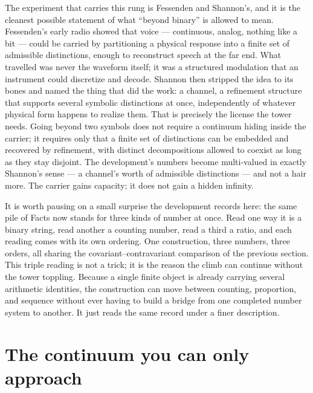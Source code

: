 The experiment that carries this rung is Fessenden and Shannon's, and it is the cleanest possible
statement of what ``beyond binary'' is allowed to mean. Fessenden's early radio showed that voice ---
continuous, analog, nothing like a bit --- could be carried by partitioning a physical response into a
finite set of admissible distinctions, enough to reconstruct speech at the far end. What travelled was
never the waveform itself; it was a structured modulation that an instrument could discretize and
decode. Shannon then stripped the idea to its bones and named the thing that did the work: a channel,
a refinement structure that supports several symbolic distinctions at once, independently of whatever
physical form happens to realize them. That is precisely the license the tower needs. Going beyond two
symbols does not require a continuum hiding inside the carrier; it requires only that a finite set of
distinctions can be embedded and recovered by refinement, with distinct decompositions allowed to
coexist as long as they stay disjoint. The development's numbers become multi-valued in exactly
Shannon's sense --- a channel's worth of admissible distinctions --- and not a hair more. The carrier
gains capacity; it does not gain a hidden infinity.

It is worth pausing on a small surprise the development records here: the same pile of Facts now stands
for three kinds of number at once. Read one way it is a binary string, read another a counting number,
read a third a ratio, and each reading comes with its own ordering. One construction, three numbers,
three orders, all sharing the covariant--contravariant comparison of the previous section. This triple
reading is not a trick; it is the reason the climb can continue without the tower toppling. Because a
single finite object is already carrying several arithmetic identities, the construction can move
between counting, proportion, and sequence without ever having to build a bridge from one completed
number system to another. It just reads the same record under a finer description.

\section{The continuum you can only approach}
\label{se:the-continuum-you-can-only-approach}

